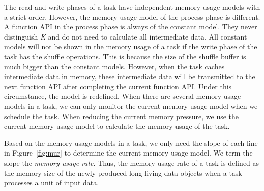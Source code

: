 The read and write phases of a task have independent memory usage models with a strict order. However, the memory usage model of the process phase is different. A function API in the process phase is always of the constant model. They never distinguish  \textit{K} and do not need to calculate all intermediate data. 
All constant models will not be shown in the memory usage of a task if the write phase of the task has the shuffle operations. This is because the size of the shuffle buffer is much bigger than the constant models. However, when the task caches intermediate data in memory, these intermediate data will be transmitted to the next function API after completing the current function API. Under this circumstance, the model is redefined. 
When there are several memory usage models in a task, we can only monitor the current memory usage model when we schedule the task. When reducing the current memory pressure, we use the current memory usage model to calculate the memory usage of the task.

Based on the memory usage models in a task, we only need the slope of each line in Figure~\ref{fig:mur} to determine the current memory usage model. We term the slope the \textit{memory usage rate}. Thus, the memory usage rate of a task is defined as the memory size of the newly produced long-living data objects when a task processes a unit of input data.




